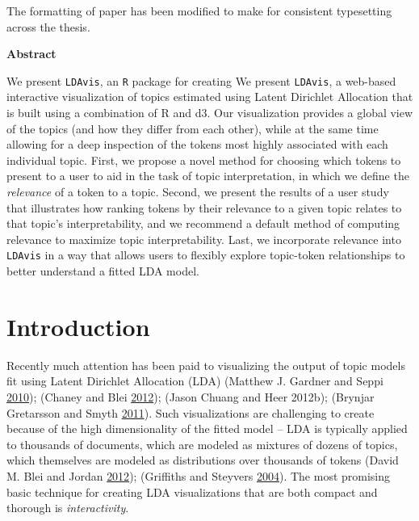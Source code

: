 \documentclass[12pt,]{isuthesis}
\begin{document}
The formatting of paper has been modified to make for consistent
typesetting across the thesis.

\begin{center}
  \begin{Large}
    \textbf{Abstract}
  \end{Large}
\end{center}

We present \texttt{LDAvis}, an \texttt{R} package for creating We
present \texttt{LDAvis}, a web-based interactive visualization of topics
estimated using Latent Dirichlet Allocation that is built using a
combination of R and d3. Our visualization provides a global view of the
topics (and how they differ from each other), while at the same time
allowing for a deep inspection of the tokens most highly associated with
each individual topic. First, we propose a novel method for choosing
which tokens to present to a user to aid in the task of topic
interpretation, in which we define the \emph{relevance} of a token to a
topic. Second, we present the results of a user study that illustrates
how ranking tokens by their relevance to a given topic relates to that
topic's interpretability, and we recommend a default method of computing
relevance to maximize topic interpretability. Last, we incorporate
relevance into \texttt{LDAvis} in a way that allows users to flexibly
explore topic-token relationships to better understand a fitted LDA
model.

\section{Introduction}\label{section:introduction}

Recently much attention has been paid to visualizing the output of topic
models fit using Latent Dirichlet Allocation (LDA) (Matthew J. Gardner
and Seppi \protect\hyperlink{ref-Gardner}{2010}); (Chaney and Blei
\protect\hyperlink{ref-Blei-2012}{2012}); (Jason Chuang and Heer 2012b);
(Brynjar Gretarsson and Smyth \protect\hyperlink{ref-Gretarsson}{2011}).
Such visualizations are challenging to create because of the high
dimensionality of the fitted model -- LDA is typically applied to
thousands of documents, which are modeled as mixtures of dozens of
topics, which themselves are modeled as distributions over thousands of
tokens (David M. Blei and Jordan
\protect\hyperlink{ref-Blei-2003}{2012}); (Griffiths and Steyvers
\protect\hyperlink{ref-Griffiths}{2004}). The most promising basic
technique for creating LDA visualizations that are both compact and
thorough is \emph{interactivity}.
\end{document}

